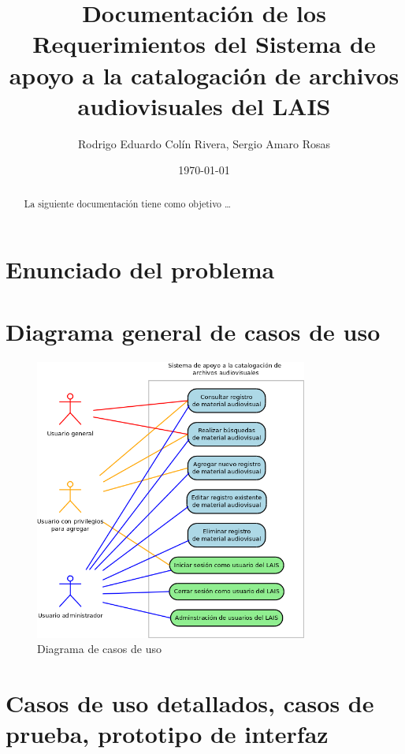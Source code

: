 \documentclass[10pt,letterpaper]{article}
\begin{document}
\title{Documentación de los Requerimientos del Sistema de apoyo a la catalogación de archivos audiovisuales del LAIS}
\author{Rodrigo Eduardo Colín Rivera, Sergio Amaro Rosas}
\date{\today}
\maketitle

\setcounter{secnumdepth}{0} %
\setcounter{tocdepth}{0} %
\graphicspath{{../Diagramas/}} %

\begin{abstract}
La siguiente documentación tiene como objetivo \ldots
\end{abstract}

\section{Enunciado del problema}

\section{Diagrama general de casos de uso}
\begin{figure}[H]
	\centering
	\includegraphics[width=0.8\textwidth]{CasosDeUso.png}
	\caption{Diagrama de casos de uso}
	\label{fig:caso_de_uso}
\end{figure}

\section{Casos de uso detallados, casos de prueba, prototipo de interfaz}
\end{document}
